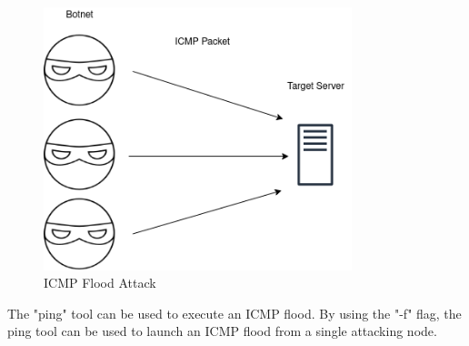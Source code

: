 \begin{figure}[H]
	\centering
	\includegraphics[width=0.8\textwidth]{images/ICMPFlood}
	\caption{ICMP Flood Attack}
	\label{fig:images-ICMPFlood}
\end{figure}

The "ping" tool can be used to execute an ICMP flood. By using the "-f" flag,
the ping tool can be used to launch an ICMP flood from a single attacking node.
